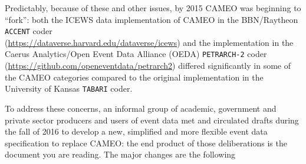 \documentclass[11pt]{report}
\newcommand{\txt}[1]{\texttt{#1}}
\begin{document}
Predictably, because of these and other issues, by 2015 CAMEO was beginning to ``fork'': both the ICEWS data implementation of CAMEO in the BBN/Raytheon \txt{ACCENT} coder \\ (\url{https://dataverse.harvard.edu/dataverse/icews}) and the implementation in the Caerus Analytics/Open Event Data Alliance (OEDA) \txt{PETRARCH-2} coder (\url{https://github.com/openeventdata/petrarch2}) differed significantly in some of the CAMEO categories compared to the original implementation in the University of Kansas \txt{TABARI} coder. 

To address these concerns, an informal group of academic, government and private sector producers and users of event data met and circulated drafts during the fall of 2016 to develop a new, simplified and more flexible event data specification to replace CAMEO: the end product of those deliberations is the document you are reading. The major changes are the following
\end{document}
